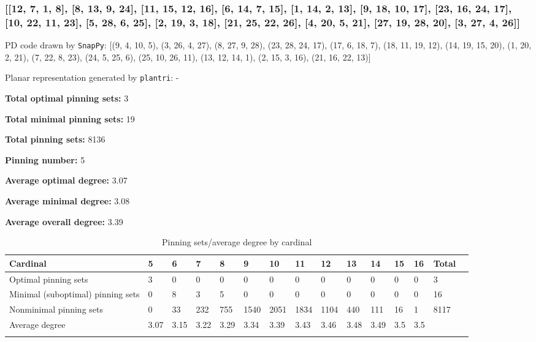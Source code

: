 \documentclass{article}%
\begin{document}
\newpage

\subsubsection{[[12, 7, 1, 8], [8, 13, 9, 24], [11, 15, 12, 16], [6, 14, 7, 15], [1, 14, 2, 13], [9, 18, 10, 17], [23, 16, 24, 17], [10, 22, 11, 23], [5, 28, 6, 25], [2, 19, 3, 18], [21, 25, 22, 26], [4, 20, 5, 21], [27, 19, 28, 20], [3, 27, 4, 26]]}

{\small\noindent PD code drawn by \texttt{SnapPy}: [(9, 4, 10, 5), (3, 26, 4, 27), (8, 27, 9, 28), (23, 28, 24, 17), (17, 6, 18, 7), (18, 11, 19, 12), (14, 19, 15, 20), (1, 20, 2, 21), (7, 22, 8, 23), (24, 5, 25, 6), (25, 10, 26, 11), (13, 12, 14, 1), (2, 15, 3, 16), (21, 16, 22, 13)]}

{\small\noindent Planar representation generated by \texttt{plantri}: -}

\begin{multicols}{2}
{\normalsize \noindent\textbf{Total optimal pinning sets:} 3

\noindent\textbf{Total minimal pinning sets:} 19

\noindent\textbf{Total pinning sets:} 8136

\noindent\textbf{Pinning number:} 5

}
\columnbreak

{\normalsize \noindent\textbf{Average optimal degree:} 3.07

\noindent\textbf{Average minimal degree:} 3.08

\noindent\textbf{Average overall degree:} 3.39

}
\end{multicols}

\begin{table}[ht]
	\caption{Pinning sets/average degree by cardinal}
	\centering
	\renewcommand{\arraystretch}{1.5}
	\begin{tabularx}{\textwidth}{lXXXXXXXXXXXXXX}
		\toprule
			Cardinal & 5 & 6 & 7 & 8 & 9 & 10 & 11 & 12 & 13 & 14 & 15 & 16 & Total\\
			\hline
			Optimal pinning sets & 3 & 0 & 0 & 0 & 0 & 0 & 0 & 0 & 0 & 0 & 0 & 0 & 3 \\
			Minimal (suboptimal) pinning sets & 0 & 8 & 3 & 5 & 0 & 0 & 0 & 0 & 0 & 0 & 0 & 0 & 16 \\
			Nonminimal pinning sets & 0 & 33 & 232 & 755 & 1540 & 2051 & 1834 & 1104 & 440 & 111 & 16 & 1 & 8117 \\
			Average degree & 3.07 & 3.15 & 3.22 & 3.29 & 3.34 & 3.39 & 3.43 & 3.46 & 3.48 & 3.49 & 3.5 & 3.5 &  \\
		\bottomrule \\ 
	\end{tabularx}
\end{table}
\end{document}

